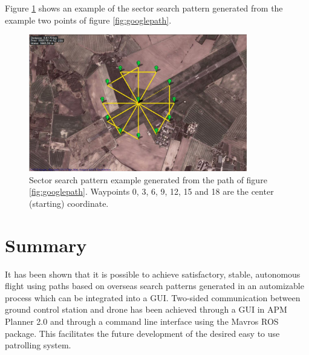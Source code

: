 Figure \ref{fig:sector} shows an example of the sector search pattern generated from the example
two points of figure \ref{fig:googlepath}.
\begin{figure}[ht]
	\centering
	\includegraphics[width=0.85\textwidth]{Images/sector}
	\caption[Sector search pattern example.]{Sector search pattern example generated from the path of figure
		\ref{fig:googlepath}. Waypoints 0, 3, 6, 9, 12, 15 and 18 are the center (starting) coordinate.}
	\label{fig:sector}
\end{figure}

\section{Summary}
It has been shown that it is possible to achieve satisfactory, stable, autonomous flight
using paths based on overseas search patterns generated in an automizable process which
can be integrated into a GUI. Two-sided communication between ground control station and drone
has been achieved through a GUI in APM Planner 2.0 and through a command line interface using
the Mavros ROS package.
This facilitates the future development of the desired easy to use patrolling system.

\newpage